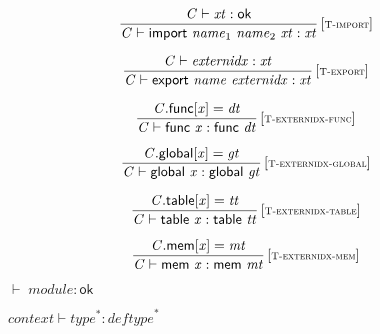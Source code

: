$$
\begin{array}{@{}c@{}}\displaystyle
\frac{
{\mathit{C}} \vdash {\mathit{xt}} : \mathsf{ok}
}{
{\mathit{C}} \vdash \mathsf{import}~{\mathit{name}}_{{1}}~{\mathit{name}}_{{2}}~{\mathit{xt}} : {\mathit{xt}}
} \, {[\textsc{\scriptsize T{-}import}]}
\qquad
\end{array}
$$

$$
\begin{array}{@{}c@{}}\displaystyle
\frac{
{\mathit{C}} \vdash {\mathit{externidx}} : {\mathit{xt}}
}{
{\mathit{C}} \vdash \mathsf{export}~{\mathit{name}}~{\mathit{externidx}} : {\mathit{xt}}
} \, {[\textsc{\scriptsize T{-}export}]}
\qquad
\end{array}
$$

\vspace{1ex}

$$
\begin{array}{@{}c@{}}\displaystyle
\frac{
{\mathit{C}}.\mathsf{func}[{\mathit{x}}] = {\mathit{dt}}
}{
{\mathit{C}} \vdash \mathsf{func}~{\mathit{x}} : \mathsf{func}~{\mathit{dt}}
} \, {[\textsc{\scriptsize T{-}externidx{-}func}]}
\qquad
\end{array}
$$

$$
\begin{array}{@{}c@{}}\displaystyle
\frac{
{\mathit{C}}.\mathsf{global}[{\mathit{x}}] = {\mathit{gt}}
}{
{\mathit{C}} \vdash \mathsf{global}~{\mathit{x}} : \mathsf{global}~{\mathit{gt}}
} \, {[\textsc{\scriptsize T{-}externidx{-}global}]}
\qquad
\end{array}
$$

$$
\begin{array}{@{}c@{}}\displaystyle
\frac{
{\mathit{C}}.\mathsf{table}[{\mathit{x}}] = {\mathit{tt}}
}{
{\mathit{C}} \vdash \mathsf{table}~{\mathit{x}} : \mathsf{table}~{\mathit{tt}}
} \, {[\textsc{\scriptsize T{-}externidx{-}table}]}
\qquad
\end{array}
$$

$$
\begin{array}{@{}c@{}}\displaystyle
\frac{
{\mathit{C}}.\mathsf{mem}[{\mathit{x}}] = {\mathit{mt}}
}{
{\mathit{C}} \vdash \mathsf{mem}~{\mathit{x}} : \mathsf{mem}~{\mathit{mt}}
} \, {[\textsc{\scriptsize T{-}externidx{-}mem}]}
\qquad
\end{array}
$$

\vspace{1ex}

$\boxed{{ \vdash }\;{\mathit{module}} : \mathsf{ok}}$

$\boxed{{\mathit{context}} \vdash {{\mathit{type}}^\ast} : {{\mathit{deftype}}^\ast}}$

